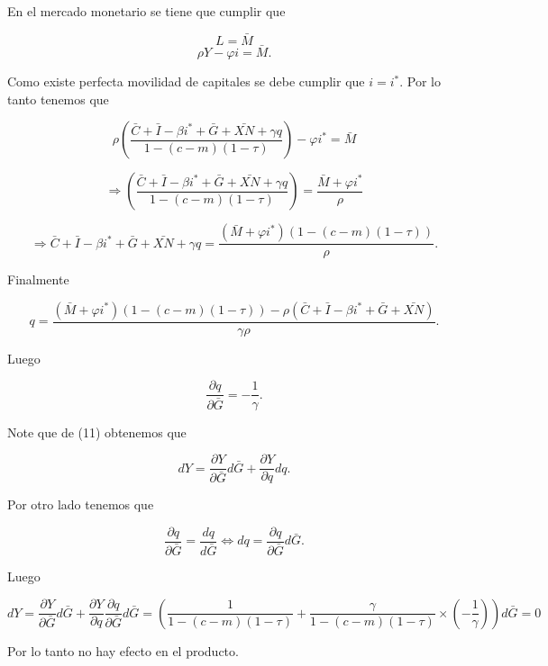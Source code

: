 \documentclass[a4paper]{article}
\begin{document}
\begin{itemize}
    \begin{solution}
En el mercado monetario se tiene que cumplir que

\[
L = \bar{M}
\]
\[
\rho Y - \varphi i = \bar{M}.
\]

Como existe perfecta movilidad de capitales se debe cumplir que $i = i^*$. Por lo tanto tenemos que

\[
\rho \left( \frac{\bar{C} + \bar{I} - \beta i^* + \bar{G} + \bar{XN} + \gamma q}{1 - (c - m)(1 - \tau)} \right) - \varphi i^* = \bar{M}
\]

\[
\Rightarrow \left( \frac{\bar{C} + \bar{I} - \beta i^* + \bar{G} + \bar{XN} + \gamma q}{1 - (c - m)(1 - \tau)} \right) = \frac{\bar{M} + \varphi i^*}{\rho}
\]

\[
\Rightarrow \bar{C} + \bar{I} - \beta i^* + \bar{G} + \bar{XN} + \gamma q = \frac{(\bar{M} + \varphi i^*)(1 - (c - m)(1 - \tau))}{\rho}.
\]

Finalmente

\[
q = \frac{(\bar{M} + \varphi i^*)(1 - (c - m)(1 - \tau)) - \rho (\bar{C} + \bar{I} - \beta i^* + \bar{G} + \bar{XN})}{\gamma \rho}.
\]

Luego

\[
\frac{\partial q}{\partial \bar{G}} = -\frac{1}{\gamma}.
\]

Note que de (11) obtenemos que

\[
dY = \frac{\partial Y}{\partial \bar{G}} d\bar{G} + \frac{\partial Y}{\partial q} dq.
\]

Por otro lado tenemos que

\[
\frac{\partial q}{\partial \bar{G}} = \frac{dq}{d\bar{G}} \iff dq = \frac{\partial q}{\partial \bar{G}} d\bar{G}.
\]

Luego

\[
dY = \frac{\partial Y}{\partial \bar{G}} d\bar{G} + \frac{\partial Y}{\partial q} \frac{\partial q}{\partial \bar{G}} d\bar{G} = \left( \frac{1}{1 - (c - m)(1 - \tau)} + \frac{\gamma}{1 - (c - m)(1 - \tau)} \times \left(-\frac{1}{\gamma}\right) \right) d\bar{G} = 0
\]

Por lo tanto no hay efecto en el producto.


\end{solution}
\end{itemize}
\end{document}
